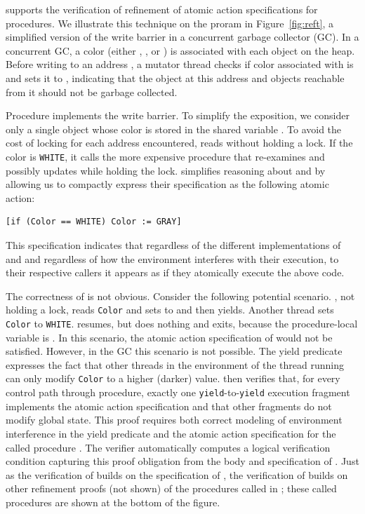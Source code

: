 \civl supports the verification of refinement of atomic action specifications for procedures. 
We illustrate this technique on the proram in Figure~\ref{fig:reft},
a simplified version of the write barrier in a concurrent garbage collector (GC).
In a concurrent GC, a color (either , , or )
is associated with each object on the heap.  
Before writing to an address , a mutator thread checks 
if color associated with  is 
and sets it to , indicating that the object at this address
and objects reachable from it should not be garbage collected. 

Procedure  implements the write barrier.
To simplify the exposition, 
we consider only a single object whose color is stored in the shared variable .
To avoid the cost of locking for each address encountered,  reads  without holding a lock.
If the color is {\tt WHITE}, it calls the more expensive procedure  
that re-examines and possibly updates  while holding the lock.
\civl simplifies reasoning about  and  by allowing us to 
compactly express their specification as the following atomic action:
\begin{verbatim}
[if (Color == WHITE) Color := GRAY]
\end{verbatim}
This specification indicates that regardless of the different implementations of 
 and  and regardless of how the environment interferes
with their execution, to their respective callers it appears as if they atomically execute the above code.

The correctness of  is not obvious.
Consider the following potential scenario. 
, not holding a lock, reads {\tt Color} and
sets  to  and then yields. Another thread sets {\tt Color} to
{\tt WHITE}.  resumes, but does nothing and exits,
because the procedure-local variable  is . In this scenario, the atomic action
specification of  would not be satisfied. However, in the GC this
scenario is not possible. 
The yield predicate expresses the fact that
other threads in the environment of the thread running  can
only modify {\tt Color} to a higher (darker) value. 
\civl then verifies that, for every control path through 
procedure, exactly one {\tt yield}-to-{\tt yield} execution
fragment implements the atomic action specification and that other fragments do not modify
global state. 
This proof requires both correct modeling of environment interference in the yield predicate
and the atomic action specification for the called procedure .
The \civl verifier automatically computes a logical verification condition capturing
this proof obligation from the body and specification of .
Just as the verification of  builds on the specification of ,
the verification of  builds on other refinement proofs (not shown) 
of the procedures called in ;
these called procedures are shown at the bottom of the figure. 

